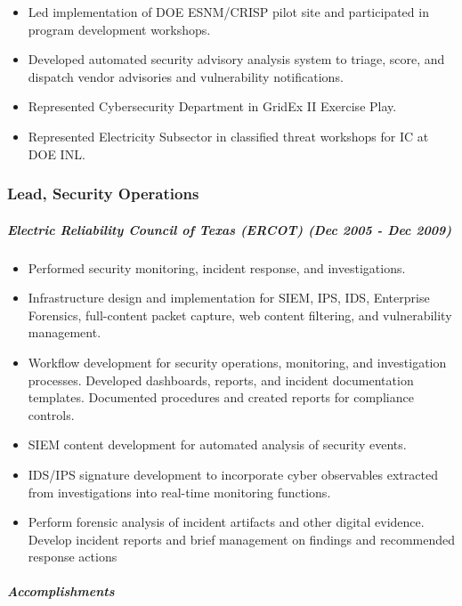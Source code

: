 \documentclass[10pt,]{article}
\providecommand{\tightlist}{%
  \setlength{\itemsep}{0pt}\setlength{\parskip}{0pt}}
\let\oldsubparagraph\subparagraph
\renewcommand{\subparagraph}[1]{\oldsubparagraph{#1}\mbox{}}
\begin{document}
\begin{itemize}
\tightlist
\item
  Led implementation of DOE ESNM/CRISP pilot site and participated in
  program development workshops.
\item
  Developed automated security advisory analysis system to triage,
  score, and dispatch vendor advisories and vulnerability notifications.
\item
  Represented Cybersecurity Department in GridEx II Exercise Play.
\item
  Represented Electricity Subsector in classified threat workshops for
  IC at DOE INL.
\end{itemize}

\subsubsection{Lead, Security
Operations}\label{lead-security-operations}

\subparagraph{\texorpdfstring{\emph{Electric Reliability Council of
Texas (ERCOT)} (Dec 2005 - Dec
2009)}{Electric Reliability Council of Texas (ERCOT) (Dec 2005 - Dec 2009)}}\label{electric-reliability-council-of-texas-ercot-dec-2005---dec-2009}

\begin{itemize}
\tightlist
\item
  Performed security monitoring, incident response, and investigations.
\item
  Infrastructure design and implementation for SIEM, IPS, IDS,
  Enterprise Forensics, full-content packet capture, web content
  filtering, and vulnerability management.
\item
  Workflow development for security operations, monitoring, and
  investigation processes. Developed dashboards, reports, and incident
  documentation templates. Documented procedures and created reports for
  compliance controls.
\item
  SIEM content development for automated analysis of security events.
\item
  IDS/IPS signature development to incorporate cyber observables
  extracted from investigations into real-time monitoring functions.
\item
  Perform forensic analysis of incident artifacts and other digital
  evidence. Develop incident reports and brief management on findings
  and recommended response actions
\end{itemize}

\subparagraph{Accomplishments}\label{accomplishments-2}
\end{document}
